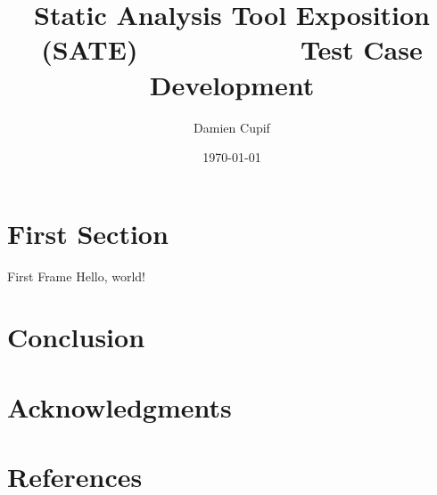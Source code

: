 \documentclass{beamer}
\title{Static Analysis Tool Exposition (SATE) ~~~~~~~~~~ Test Case Development}
\date{\today}
\author{Damien Cupif}
\institute{Oral Defense for TELECOM Nancy Master's Degree}
\begin{document}
  \maketitle
  \section{First Section}
  \begin{frame}{First Frame}
    Hello, world!
  \end{frame}
  \section{Conclusion}
  \section{Acknowledgments}
  \section{References}
\end{document}
